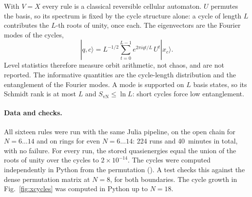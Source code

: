 With $V=X$ every rule is a classical reversible cellular automaton. $U$ permutes the basis, so its spectrum is fixed
by the cycle structure alone: a cycle of length $L$ contributes the $L$-th roots of unity, once each. The eigenvectors
are the Fourier modes of the cycles,
\[
  |q,c\rangle = L^{-1/2}\sum_{t=0}^{L-1} e^{2\pi i q t/L}\,U^t|x_c\rangle .
\]
Level statistics therefore measure orbit arithmetic, not chaos, and are not reported. The informative quantities are
the cycle-length distribution and the entanglement of the Fourier modes. A mode is supported on $L$ basis states, so
its Schmidt rank is at most $L$ and $S_\mathrm{vN}\le\ln L$: short cycles force low entanglement.

\paragraph{Data and checks.} All sixteen rules were run with the same Julia pipeline, on the open chain for $N=6\ldots14$
and on rings for even $N=6\ldots14$: 224 runs and 40~minutes in total, with no failure. For every run, the stored
quasienergies equal the union of the roots of unity over the cycles to $2\times10^{-14}$. The cycles were computed
independently in Python from the permutation (). A test checks this against the dense
permutation matrix at $N=8$, for both boundaries. The cycle growth in Fig.~\ref{fig:xcycles} was computed in Python up
to $N=18$.

